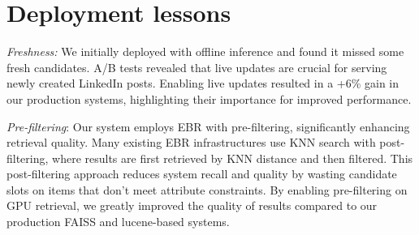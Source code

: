 \section{Deployment lessons}\label{sec:deployment_lessons}

\textit{Freshness:} We initially deployed {\systemname} with offline inference and found it missed some fresh candidates. A/B tests revealed that live updates are crucial for serving newly created LinkedIn posts. Enabling live updates resulted in a +6\% gain in our production systems, highlighting their importance for improved performance.

\textit{Pre-filtering}: Our system employs EBR with pre-filtering, significantly enhancing retrieval quality. Many existing EBR infrastructures use KNN search with post-filtering, where results are first retrieved by KNN distance and then filtered. This post-filtering approach reduces system recall and quality by wasting candidate slots on items that don't meet attribute constraints. By enabling pre-filtering on GPU retrieval, we greatly improved the quality of results compared to our production FAISS and lucene-based systems.

